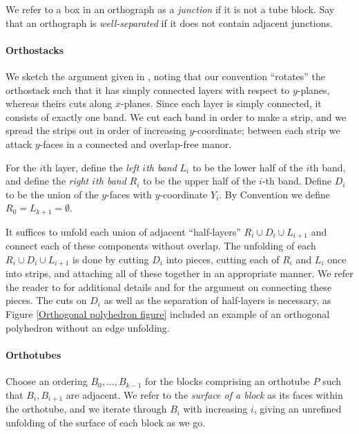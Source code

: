 \documentclass{article}
\begin{document}
We refer to a box in an orthograph as a \emph{junction} if it is not a tube block.
Say that an orthograph is \emph{well-separated} if it does not contain adjacent junctions.

\paragraph{Orthostacks}
We sketch the argument given in \cite{Biedl_Demaine}, noting that our convention ``rotates'' the orthostack such that it has simply connected layers with respect to $y$-planes, whereas theirs cuts along $x$-planes.
Since each layer is simply connected, it consists of exactly one band.
We cut each band in order to make a strip, and we spread the strips out in order of increasing $y$-coordinate;
between each strip we attack $y$-faces in a connected and overlap-free manor.

For the $i$th layer, define the \emph{left $i$th band} $L_i$ to be the lower half of the $i$th band, and define the \emph{right $i$th band} $R_i$ to be the upper half of the $i$-th band.
Define $D_i$ to be the union of the $y$-faces with $y$-coordinate $Y_i$.
By Convention we define $R_0 = L_{k+1} = \emptyset$.

It suffices to unfold each union of adjacent ``half-layers'' $R_i \cup D_i \cup L_{i+1}$ and connect each of these components without overlap.
The unfolding of each $R_i \cup D_i \cup L_{i+1}$ is done by cutting $D_i$ into pieces, cutting each of $R_i$ and $L_i$ once into strips, and attaching all of these together in an appropriate manner.
We refer the reader to \cite{Biedl_Demaine} for additional details and for the argument on connecting these pieces.
The cuts on $D_i$ as well as the separation of half-layers is necessary, as Figure \ref{Orthogonal polyhedron figure} included an example of an orthogonal polyhedron without an edge unfolding.

\paragraph{Orthotubes}
Choose an ordering $B_0,\dots,B_{k-1}$ for the blocks comprising an orthotube $P$ such that $B_i,B_{i+1}$ are adjacent.
We refer to the \emph{surface of a block} as its faces within the orthotube, and we iterate through $B_i$ with increasing $i$, giving an unrefined unfolding of the surface of each block as we go.
\end{document}
